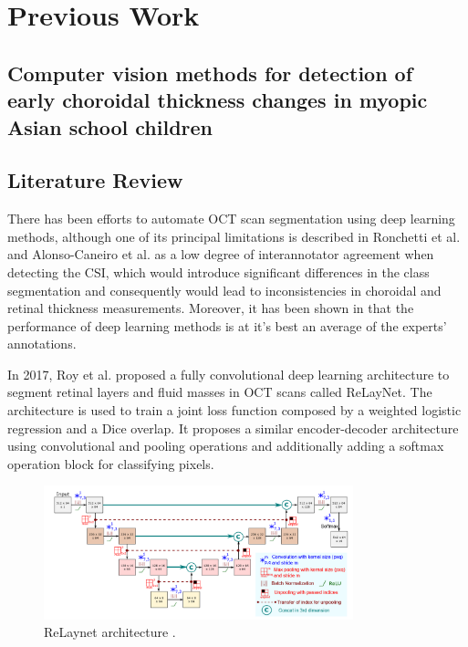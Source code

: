 \documentclass[12pt,a4paper]{scrartcl}
\begin{document}
\section{Previous Work}\label{s:prevWork}
\subsection{Computer vision methods for detection of early choroidal thickness changes in myopic Asian school children}
\subsection{Literature Review}
There has been efforts to automate OCT scan segmentation using deep learning methods, although one of its principal limitations is described in Ronchetti et al. \cite{Ronchetti2019} and Alonso-Caneiro et al. \cite{Alonso-Caneiro2013} as a low degree of interannotator agreement when detecting the CSI, which would introduce significant differences in the class segmentation and consequently would lead to inconsistencies in choroidal and retinal thickness measurements. Moreover, it has been shown in \cite{Maloca2021} that the performance of deep learning methods is at it's best an average of the experts' annotations.

In 2017, Roy et al. \cite{Roy2017} proposed a fully convolutional deep learning architecture to segment retinal layers and fluid masses in OCT scans called ReLayNet. The architecture is used to train a joint loss function composed by  a weighted logistic regression and a Dice overlap. It proposes a similar encoder-decoder architecture using convolutional and pooling operations and additionally adding a softmax operation block for classifying pixels.

\begin{figure}[H]
    \centering
    \includegraphics[width=0.8\textwidth]{./images/relaynet-architecture.png}
    \caption{ReLaynet architecture \cite{Roy2017}.}
\end{figure}
\end{document}
